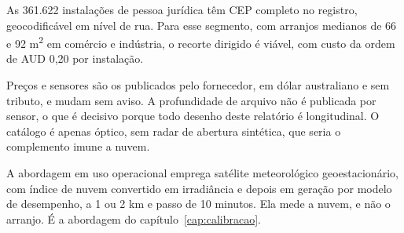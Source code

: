 As 361.622 instalações de pessoa jurídica têm CEP completo no registro,
geocodificável em nível de rua. Para esse segmento, com arranjos medianos de 66
e 92 m\textsuperscript{2} em comércio e indústria, o recorte dirigido é viável,
com custo da ordem de AUD 0,20 por instalação.

\begin{objecao}
Preços e sensores são os publicados pelo fornecedor, em dólar australiano e sem
tributo, e mudam sem aviso. A profundidade de arquivo não é publicada por
sensor, o que é decisivo porque todo desenho deste relatório é longitudinal. O
catálogo é apenas óptico, sem radar de abertura sintética, que seria o
complemento imune a nuvem.
\end{objecao}

 A abordagem em uso
operacional emprega satélite meteorológico geoestacionário, com índice de nuvem
convertido em irradiância e depois em geração por modelo de desempenho, a 1 ou
2 km e passo de 10 minutos. Ela mede a nuvem, e não o arranjo. É a abordagem do
capítulo~\ref{cap:calibracao}.
